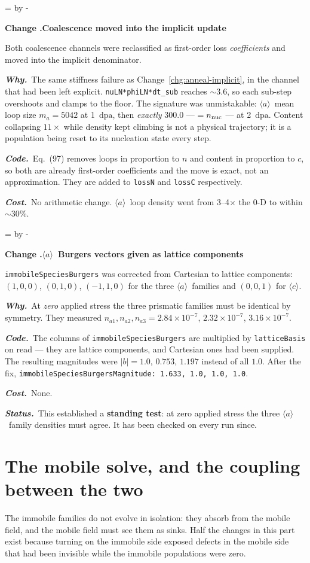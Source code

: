 \documentclass[11pt,a4paper]{article}
\newcommand{\code}[1]{\texttt{\small #1}}
\newcommand{\dpa}{\ensuremath{\mathrm{dpa}}}
\newcommand{\aloop}{\ensuremath{\langle a\rangle}}
\newcommand{\cloop}{\ensuremath{\langle c\rangle}}
\newcommand{\needlines}[1]{%
  \par\dimen0=\pagegoal \advance\dimen0 by -\pagetotal
  \ifdim\dimen0<#1\baselineskip \newpage \fi}
\newcounter{chg}
\newcommand{\change}[1]{%
  \needlines{4}%
  \refstepcounter{chg}%
  \par\medskip\noindent
  {\bfseries\boldmath Change \thechg.\quad #1}%
  \par\nobreak\smallskip}
\newcommand{\why}[1]{\par\noindent\textbf{\itshape Why.}\ #1\par}
\newcommand{\impact}[1]{\par\noindent\textbf{\itshape Code.}\ #1\par}
\newcommand{\cost}[1]{\par\noindent\textbf{\itshape Cost.}\ #1\par}
\newcommand{\status}[1]{\par\noindent\textbf{\itshape Status.}\ #1\par}
\begin{document}
\change{Coalescence moved into the implicit update}
\label{chg:coal-implicit}
Both coalescence channels were reclassified as first-order loss
\emph{coefficients} and moved into the implicit denominator.
\why{The same stiffness failure as Change~\ref{chg:anneal-implicit}, in the
channel that had been left explicit. \code{nuLN*phiLN*dt\_sub} reaches
$\sim3.6$, so each sub-step overshoots and clamps to the floor. The signature
was unmistakable: \aloop\ mean loop size $m_a = 5042$ at 1~\dpa, then
\emph{exactly} $300.0$ --- $= n_{\rm nuc}$ --- at 2~\dpa. Content collapsing
$11\times$ while density kept climbing is not a physical trajectory; it is a
population being reset to its nucleation state every step.}
\impact{Eq.~(97) removes loops in proportion to $n$ and content in proportion
to $c$, so both are already first-order coefficients and the move is exact,
not an approximation. They are added to \code{lossN} and \code{lossC}
respectively.}
\cost{No arithmetic change. \aloop\ loop density went from 3--4$\times$ the
0-D to within $\sim$30\%.}

\change{\aloop\ Burgers vectors given as lattice components}
\label{chg:burgers}
\code{immobileSpeciesBurgers} was corrected from Cartesian to lattice
components: $(1,0,0)$, $(0,1,0)$, $(-1,1,0)$ for the three \aloop\ families
and $(0,0,1)$ for \cloop.
\why{At \emph{zero} applied stress the three prismatic families must be
identical by symmetry. They measured $n_{a1},n_{a2},n_{a3} = 2.84\times
10^{-7}$, $2.32\times10^{-7}$, $3.16\times10^{-7}$.}
\impact{The columns of \code{immobileSpeciesBurgers} are multiplied by
\code{latticeBasis} on read --- they are lattice components, and Cartesian
ones had been supplied. The resulting magnitudes were $|b| = 1.0$, $0.753$,
$1.197$ instead of all $1.0$. After the fix,
\code{immobileSpeciesBurgersMagnitude: 1.633, 1.0, 1.0, 1.0}.}
\cost{None.}
\status{This established a \textbf{standing test}: at zero applied stress the
three \aloop\ family densities must agree. It has been checked on every run
since.}

\part{The mobile solve, and the coupling between the two}
\label{part:mobile}

The immobile families do not evolve in isolation: they absorb from the mobile
field, and the mobile field must see them as sinks. Half the changes in this
part exist because turning on the immobile side exposed defects in the mobile
side that had been invisible while the immobile populations were zero.
\end{document}

